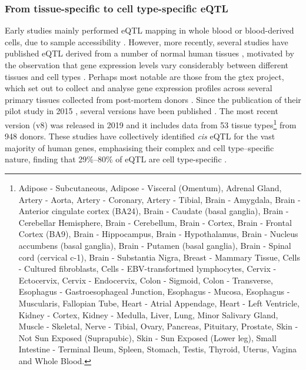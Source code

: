 \subsubsection{From tissue-specific to cell type-specific eQTL}
\label{sec:eqtl_celltype_specific}

Early studies mainly performed eQTL mapping in whole blood or blood-derived cells, due to sample accessibility \cite{stranger2007population, pickrell2010understanding}.
However, more recently, several studies have published eQTL derived from a number of normal human tissues \cite{myers2007survey, zhong2010liver,fu2012unraveling, nica2011architecture, dimas2009common, fairfax2012genetics, stranger2012patterns, schadt2008mapping, hao2012lung, innocenti2011identification}, motivated by the observation that gene expression levels vary considerably between different tissues and cell types \cite{su2002large}.
Perhaps most notable are those from the \gls{gtex} project, which set out to collect and analyse gene expression profiles across several primary tissues collected from post-mortem donors \cite{lonsdale2013genotype}.
Since the publication of their pilot study in 2015 \cite{gtex2015genotype}, several versions have been published \cite{gtex2017genetic, aguet2019gtex}.
The most recent version (v8) was released in 2019 and it includes data from 53 tissue types\footnote{Adipose - Subcutaneous, Adipose - Visceral (Omentum), Adrenal Gland, Artery - Aorta, Artery - Coronary, Artery - Tibial, 
Brain - Amygdala, Brain - Anterior cingulate cortex (BA24), Brain - Caudate (basal ganglia), Brain - Cerebellar Hemisphere, Brain - Cerebellum, Brain - Cortex, Brain - Frontal Cortex (BA9), Brain - Hippocampus, Brain - Hypothalamus, Brain - Nucleus accumbens (basal ganglia), Brain - Putamen (basal ganglia), Brain - Spinal cord (cervical c-1), Brain - Substantia Nigra, 
Breast - Mammary Tissue, Cells - Cultured fibroblasts, Cells - EBV-transfortmed lymphocytes,  Cervix - Ectocervix, Cervix - Endocervix, Colon - Sigmoid, Colon - Transverse, Esophagus - Gastroesophageal Junction, Esophagus - Mucosa, Esophagus - Muscularis, Fallopian Tube, Heart - Atrial Appendage, Heart - Left Ventricle, Kidney - Cortex, Kidney - Medulla, Liver, Lung,  Minor Salivary Gland, Muscle - Skeletal, Nerve - Tibial, Ovary, Pancreas, Pituitary, Prostate, Skin - Not Sun Exposed (Suprapubic), Skin - Sun Exposed (Lower leg), Small Intestine - Terminal Ileum, Spleen, Stomach, Testis, Thyroid, Uterus, Vagina and Whole Blood.} from 948 donors.
These studies have collectively identified \textit{cis} eQTL for the vast majority of human genes, emphasising their complex and cell type–specific nature, finding that 29\%–80\% of eQTL are cell type-specific \cite{gtex2015genotype, nica2011architecture, dimas2009common,  fairfax2012genetics}. \\

